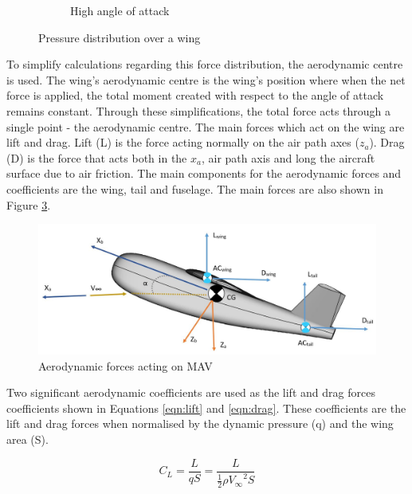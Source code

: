 \begin{figure}[H]
\begin{subfigure}[b]{0.45\textwidth}
         \caption{High angle of attack}
         \label{fig:Press2b}
     \end{subfigure}
     \hfill
        \caption{Pressure distribution over a wing }
        \label{fig:pressureWing}
\end{figure}



To simplify calculations regarding this force distribution, the aerodynamic centre is used. The wing's aerodynamic centre is the wing's position where when the net force is applied, the total moment created with respect to the angle of attack remains constant. Through these simplifications, the total force acts through a single point - the aerodynamic centre. The main forces which act on the wing are lift and drag. Lift (L) is the force acting normally on the air path axes ($z_a$). Drag (D) is the force that acts both in the $x_a$, air path axis and long the aircraft surface due to air friction. The main components for the aerodynamic forces and coefficients are the wing, tail and fuselage. The main forces are also shown in Figure \ref{fig:aeroforces}.



\begin{figure}[H]
  \centering
  \includegraphics[width=1\linewidth]{03_LiteratureReview/Figs/Aeroforces2.JPG}
  \caption{Aerodynamic forces acting on MAV}
  \label{fig:aeroforces}
\end{figure}
Two significant aerodynamic coefficients are used as the lift and drag forces coefficients shown in Equations \ref{eqn:lift} and \ref{eqn:drag}. These coefficients are the lift and drag forces when normalised by the dynamic pressure (q) and the wing area (S). 


\begin{equation}
    C_L = \frac{L}{qS} = \frac{L}{\frac{1}{2}\rho {V_\infty}^2 S}
    \label{eqn:lift}
\end{equation}

